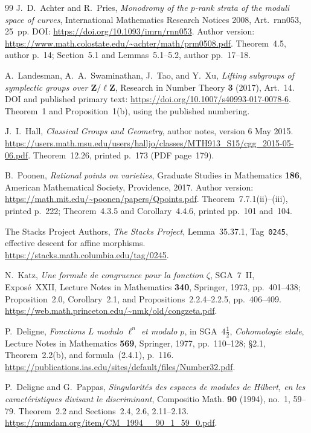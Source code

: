 \begin{thebibliography}{99}
J.~D.~Achter and R.~Pries,
\emph{Monodromy of the $p$-rank strata of the moduli space of curves},
International Mathematics Research Notices 2008,
Art.~rnn053, 25~pp.
DOI: \url{https://doi.org/10.1093/imrn/rnn053}.
Author version:
\url{https://www.math.colostate.edu/~achter/math/prm0508.pdf}.
Theorem~4.5, author p.~14; Section~5.1 and Lemmas~5.1--5.2,
author pp.~17--18.

A.~Landesman, A.~A.~Swaminathan, J.~Tao, and Y.~Xu,
\emph{Lifting subgroups of symplectic groups over
$\mathbf Z/\ell\mathbf Z$},
Research in Number Theory \textbf{3} (2017), Art.~14.
DOI and published primary text:
\url{https://doi.org/10.1007/s40993-017-0078-6}.
Theorem~1 and Proposition~1(b), using the published numbering.

J.~I.~Hall, \emph{Classical Groups and Geometry},
author notes, version 6 May 2015.
\url{https://users.math.msu.edu/users/halljo/classes/MTH913_S15/cgg_2015-05-06.pdf}.
Theorem~12.26, printed p.~173 (PDF page~179).

B.~Poonen, \emph{Rational points on varieties},
Graduate Studies in Mathematics \textbf{186},
American Mathematical Society, Providence, 2017.
Author version: \url{https://math.mit.edu/~poonen/papers/Qpoints.pdf}.
Theorem~7.7.1(ii)--(iii), printed p.~222;
Theorem~4.3.5 and Corollary~4.4.6, printed pp.~101 and~104.

The Stacks Project Authors,
\emph{The Stacks Project}, Lemma~35.37.1,
Tag~\texttt{0245}, effective descent for affine morphisms.
\url{https://stacks.math.columbia.edu/tag/0245}.

N.~Katz, \emph{Une formule de congruence pour la fonction
$\zeta$}, SGA~7~II, Expos\'e~XXII, Lecture Notes in
Mathematics \textbf{340}, Springer, 1973, pp.~401--438;
Proposition~2.0, Corollary~2.1, and Propositions~2.2.4--2.2.5,
pp.~406--409.
\url{https://web.math.princeton.edu/~nmk/old/congzeta.pdf}.

P.~Deligne, \emph{Fonctions $L$ modulo $\ell^n$ et modulo $p$},
in SGA~$4\frac12$, \emph{Cohomologie etale}, Lecture Notes in
Mathematics \textbf{569}, Springer, 1977, pp.~110--128;
\S2.1, Theorem~2.2(b), and formula~(2.4.1), p.~116.
\url{https://publications.ias.edu/sites/default/files/Number32.pdf}.

P.~Deligne and G.~Pappas,
\emph{Singularit\'es des espaces de modules de Hilbert, en les
caract\'eristiques divisant le discriminant},
Compositio Math. \textbf{90} (1994), no.~1, 59--79.
Theorem~2.2 and Sections~2.4, 2.6, 2.11--2.13.
\url{https://numdam.org/item/CM_1994__90_1_59_0.pdf}.


\end{thebibliography}

